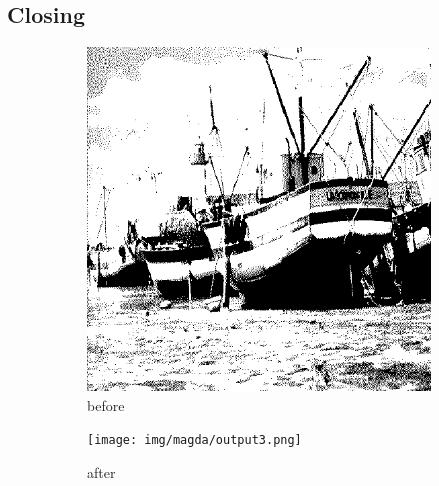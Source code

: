 \documentclass[12pt]{article}
\renewcommand{\subfiguresize}{.25\textwidth}
\begin{document}
\subsection{Closing}
\begin{figure}[H]\centering
    \begin{subfigure}[t]{\subfiguresize}\centering
        \includegraphics[width=\textwidth]{img/magda/boatbw.png}
        \caption{before}
    \end{subfigure}
    \hspace{2em}
    \begin{subfigure}[t]{\subfiguresize}\centering
        \texttt{[image: img/magda/output3.png]}
        \caption{after}
    \end{subfigure}\\[1em]
    \begin{subfigure}[t]{\subfiguresize}\centering

\end{subfigure}
\end{figure}
\end{document}
